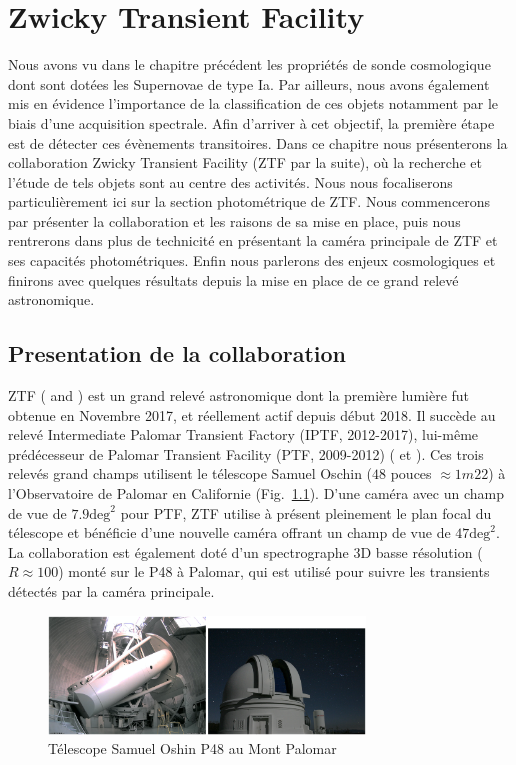 \documentclass[../main/main.tex]{subfiles}
\begin{document}
\chapter{Zwicky Transient Facility}\label{ch:ztf}

\minitoc
\vspace{2cm}
Nous avons vu dans le chapitre précédent les propriétés
de sonde
cosmologique dont sont dotées les Supernovae de type Ia. Par
ailleurs, nous avons également mis en évidence l'importance de la
classification de ces objets notamment par le biais d'une acquisition
spectrale. Afin d'arriver à cet objectif, la première étape est de
détecter ces évènements transitoires. Dans ce chapitre nous présenterons
la collaboration Zwicky Transient Facility (ZTF par la suite), où la recherche et
l'étude de tels objets sont au centre des activités. Nous nous
focaliserons particulièrement ici sur la section photométrique de
ZTF. Nous commencerons par présenter la collaboration et les raisons de
sa mise en place, puis nous rentrerons dans plus de technicité en
présentant la caméra principale de ZTF et ses capacités
photométriques. Enfin nous parlerons des enjeux cosmologiques et
finirons avec quelques résultats depuis la mise en place de ce grand
relevé astronomique.
\newpage
\section{Presentation de la collaboration}

ZTF ( \citet{GrahamZTF2019} and \citet{BellmZTF2019}) est un grand relevé astronomique dont la première lumière fut
obtenue en Novembre 2017, et réellement actif depuis début 2018. Il
succède au relevé Intermediate Palomar Transient Factory (IPTF, 2012-2017),
lui-même prédécesseur de Palomar Transient Facility (PTF, 2009-2012)
(\citet{RauPTF2009} et \citet{LawPTF2009}). Ces trois relevés grand
champs utilisent le télescope Samuel
Oschin ($48$ pouces $\approx 1m22$) à l'Observatoire de Palomar en
Californie (Fig.~\ref{fig:p48}). D'une caméra avec un champ de vue de $7.9 \text{deg}^{2}$
pour PTF, ZTF utilise à présent pleinement le plan focal du télescope et
bénéficie d'une nouvelle caméra offrant un champ de vue de $47
\text{deg}^{2}$. La collaboration est également doté d'un spectrographe
3D basse résolution ($R\approx100$) monté sur le P48 à Palomar, qui est
utilisé pour suivre les transients détectés par la caméra principale.

\begin{figure}
  \centering
  \includegraphics[width=0.75\textwidth]{../figures/02_ztf/p48.png}
  \caption{Télescope Samuel Oshin P48 au Mont Palomar}
  \label{fig:p48}
\end{figure}
\end{document}
